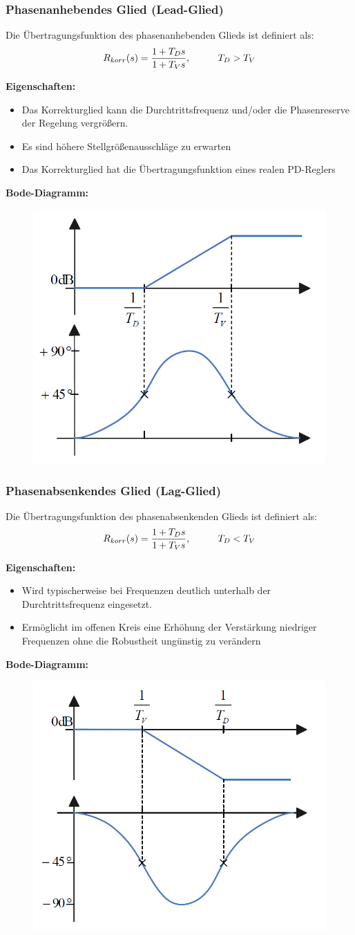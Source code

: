 \documentclass[10pt,a4paper]{article}
\newcommand{\tab}[1][1]{\hspace*{#1cm}}
\begin{document}
\subsubsection{Phasenanhebendes Glied (Lead-Glied)}
Die Übertragungsfunktion des phasenanhebenden Glieds ist definiert als:
$$
	R_{korr}(s) = \frac{1 + T_Ds}{1 + T_Vs}, \tab T_D > T_V
$$

\textbf{Eigenschaften:}
\begin{itemize}
	\item Das Korrekturglied kann die Durchtrittsfrequenz und/oder die Phasenreserve der Regelung vergrößern.
	\item Es sind höhere Stellgrößenausschläge zu erwarten
	\item Das Korrekturglied hat die Übertragungsfunktion eines realen PD-Reglers
\end{itemize}

\textbf{Bode-Diagramm:}
\begin{figure}[H]
	\includegraphics[width = 0.4\columnwidth]{imgs/lead-glied.png}
\end{figure}

\subsubsection{Phasenabsenkendes Glied (Lag-Glied)}
Die Übertragungsfunktion des phasenabsenkenden Glieds ist definiert als:
$$
	R_{korr}(s) = \frac{1 + T_Ds}{1 + T_Vs}, \tab T_D < T_V
$$

\textbf{Eigenschaften:}
\begin{itemize}
	\item Wird typischerweise bei Frequenzen deutlich unterhalb der Durchtrittsfrequenz eingesetzt.
	\item Ermöglicht im offenen Kreis eine Erhöhung der Verstärkung niedriger Frequenzen ohne die Robustheit ungünstig zu verändern
\end{itemize}

\textbf{Bode-Diagramm:}
\begin{figure}[H]
	\includegraphics[width = 0.4\columnwidth]{imgs/lag-glied.png}
\end{figure}
\end{document}
